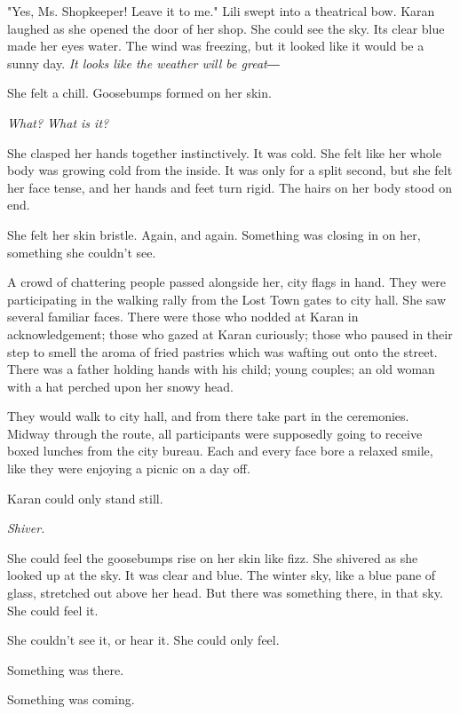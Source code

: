 "Yes, Ms. Shopkeeper! Leave it to me." Lili swept into a theatrical bow.
Karan laughed as she opened the door of her shop. She could see the sky.
Its clear blue made her eyes water. The wind was freezing, but it looked
like it would be a sunny day. \emph{It looks like the weather will be great―}

She felt a chill. Goosebumps formed on her skin.

\emph{What? What is it?}

She clasped her hands together instinctively. It was cold. She felt like
her whole body was growing cold from the inside. It was only for a split
second, but she felt her face tense, and her hands and feet turn rigid.
The hairs on her body stood on end.

She felt her skin bristle. Again, and again. Something was closing in on
her, something she couldn't see.

A crowd of chattering people passed alongside her, city flags in hand.
They were participating in the walking rally from the Lost Town gates to
city hall. She saw several familiar faces. There were those who nodded
at Karan in acknowledgement; those who gazed at Karan curiously; those
who paused in their step to smell the aroma of fried pastries which was
wafting out onto the street. There was a father holding hands with his
child; young couples; an old woman with a hat perched upon her snowy
head.

They would walk to city hall, and from there take part in the
ceremonies. Midway through the route, all participants were supposedly
going to receive boxed lunches from the city bureau. Each and every face
bore a relaxed smile, like they were enjoying a picnic on a day off.

Karan could only stand still.

\emph{Shiver.}

She could feel the goosebumps rise on her skin like fizz. She shivered
as she looked up at the sky. It was clear and blue. The winter sky, like
a blue pane of glass, stretched out above her head. But there was
something there, in that sky. She could feel it.

She couldn't see it, or hear it. She could only feel.

Something was there.

Something was coming.


